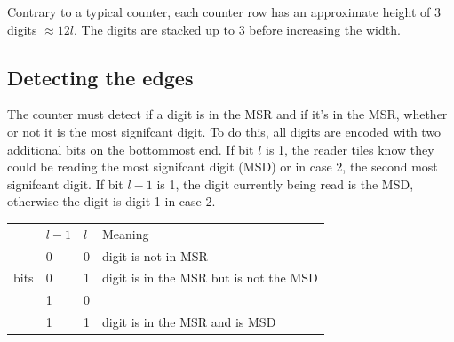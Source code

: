 Contrary to a typical counter, each counter row has an approximate height of 3 digits $\approx 12l$.
The digits are stacked up to 3 before increasing the width.

\subsection{ Detecting the edges }

The counter must detect if a digit is in the MSR and if it's in the MSR, whether or not it is the most
signifcant digit. To do this, all digits are encoded with two additional bits on the bottommost end.
If bit $l$ is 1, the reader tiles know they could be reading the most signifcant digit (MSD) or in case 2, the
second most signifcant digit. If bit $l - 1$ is 1, the digit currently being read is the MSD, otherwise
the digit is digit 1 in case 2.

\begin{table}[H]
    \begin{tabular}{|l|l|l|l|}
    \hline
    \multirow{5}{*}{bits} & $l-1$ & $l$   & Meaning                                 \\ \cline{2-4}
                          &   0   & 0   & digit is not in MSR                    \\ \cline{2-4}
                          &   0   & 1   & digit is in the MSR but is not the MSD \\ \cline{2-4}
                          &   1   & 0   &                                        \\ \cline{2-4}
                          &   1   & 1   & digit is in the MSR and is MSD         \\ \hline
    \end{tabular}
\end{table}